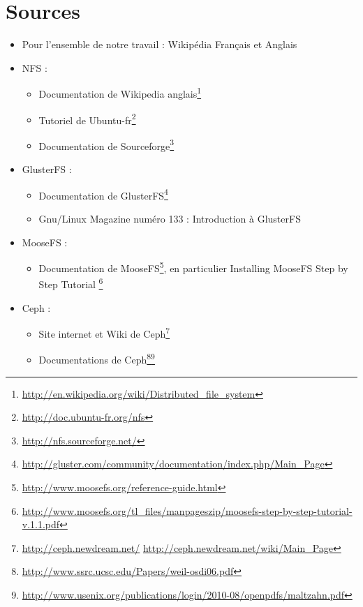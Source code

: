 \documentclass[12pt]{report}
\begin{document}
		\chapter{Sources}
     \label{Sources}
			\begin{itemize}
				\item Pour l'ensemble de notre travail : Wikipédia Français et Anglais
				\item NFS :
				\begin{itemize}
				  \item Documentation de Wikipedia anglais\footnote{\href{http://en.wikipedia.org/wiki/Distributed\_file\_system}{http://en.wikipedia.org/wiki/Distributed\_file\_system}}
				  \item Tutoriel de Ubuntu-fr\footnote{\href{http://doc.ubuntu-fr.org/nfs}{http://doc.ubuntu-fr.org/nfs}}
				  \item Documentation de Sourceforge\footnote{\href{http://nfs.sourceforge.net/}{http://nfs.sourceforge.net/}}
				\end{itemize}
				\item GlusterFS :
				\begin{itemize}
					\item Documentation de GlusterFS\footnote{\href{http://gluster.com/community/documentation/index.php/Main\_Page}
					{http://gluster.com/community/documentation/index.php/Main\_Page}}
					\item Gnu/Linux Magazine numéro 133 : \og Introduction à GlusterFS\fg
				\end{itemize}
				\item MooseFS :
				\begin{itemize}
					\item Documentation de MooseFS\footnote{\href{http://www.moosefs.org/reference-guide.html}{http://www.moosefs.org/reference-guide.html}}, en particulier
					\og Installing MooseFS Step by Step Tutorial\fg
					\footnote{\href{http://www.moosefs.org/tl_files/manpageszip/moosefs-step-by-step-tutorial-v.1.1.pdf}
					{http://www.moosefs.org/tl\_files/manpageszip/moosefs-step-by-step-tutorial-v.1.1.pdf}}
				\end{itemize}
				\item Ceph : 
				  \begin{itemize}
				  \item Site internet et Wiki de Ceph\footnote{\href{http://ceph.newdream.net/}{http://ceph.newdream.net/} \href{http://ceph.newdream.net/wiki/Main\_Page}{http://ceph.newdream.net/wiki/Main\_Page}}
				  \item Documentations de Ceph\footnote{\href{http://www.ssrc.ucsc.edu/Papers/weil-osdi06.pdf}{http://www.ssrc.ucsc.edu/Papers/weil-osdi06.pdf}}\footnote{\href{http://www.usenix.org/publications/login/2010-08/openpdfs/maltzahn.pdf}{http://www.usenix.org/publications/login/2010-08/openpdfs/maltzahn.pdf}}
				  \end{itemize}
			\end{itemize}
\end{document}
